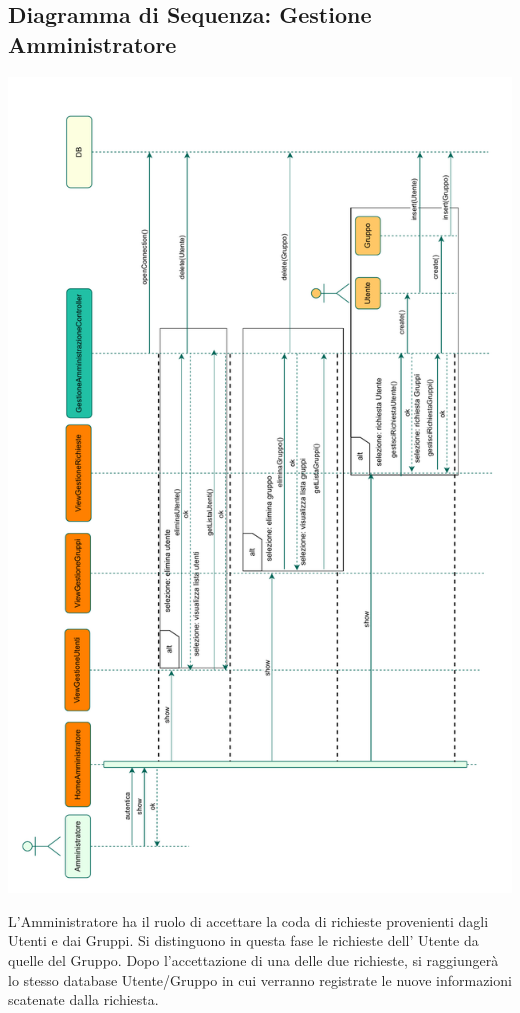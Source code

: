\subsection*{Diagramma di Sequenza: Gestione Amministratore}
{}
\begin{adjustwidth}{-1cm}{0cm}
\includegraphics[scale=0.75]{progettazione/Diagramma-Sequenza-Interazione-GestioneAmministratore.drawio.pdf}
\end{adjustwidth}
\vspace{0.5cm}
L'Amministratore ha il ruolo di accettare la coda di richieste provenienti dagli Utenti e dai Gruppi. Si distinguono in questa fase le richieste dell' Utente da quelle del Gruppo. Dopo l'accettazione di una delle due richieste, si raggiungerà lo stesso database Utente/Gruppo in cui verranno registrate le nuove informazioni scatenate dalla richiesta.



